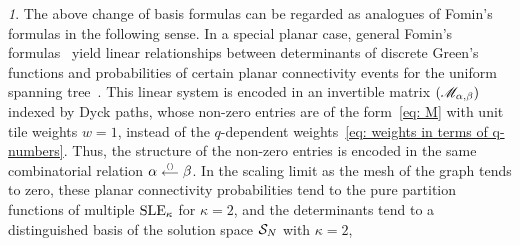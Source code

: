 \documentclass[oneside,english]{amsart}
\numberwithin{equation}{section}
\numberwithin{figure}{section}
\theoremstyle{plain}
\theoremstyle{plain}
\theoremstyle{plain}
\theoremstyle{remark}
\newtheorem{rem}[lem]{\protect\remarkname}
\theoremstyle{plain}
\theoremstyle{plain}
\theoremstyle{plain}
\theoremstyle{plain}
\theoremstyle{plain}
\theoremstyle{plain}
\theoremstyle{plain}
\theoremstyle{plain}
\providecommand{\remarkname}{Remark}
\begin{document}
%

\begin{rem}
The above change of basis formulas %
can be regarded as analogues of Fomin's formulas in the following sense.
In a special planar case, general Fomin's formulas~\cite{Fomin-LERW_and_total_positivity} yield
linear relationships between determinants of discrete Green's functions and 
probabilities of certain planar connectivity events for the uniform spanning tree~\cite[Section~3.4]{KKP-boundary_correlations_in_planar_LERW_and_UST}.
This linear system is encoded in an invertible matrix $(\mathscr{M}_{\alpha, \beta})$ indexed by Dyck paths, 
whose non-zero entries are of the form~\eqref{eq: M} with unit tile weights $w=1$, 
instead of the $q$-dependent weights~\eqref{eq: weights in terms of q-numbers}.
Thus, the structure of the non-zero entries is encoded in the same combinatorial relation $\alpha \stackrel{\scriptscriptstyle{()}}{\scriptstyle{\longleftarrow}} \beta$. 
In the scaling limit as the mesh of the graph tends to zero, these planar connectivity probabilities tend to
the pure partition functions of multiple $\mathrm{SLE}_\kappa$ for $\kappa = 2$,
and the determinants tend to a distinguished basis of the solution space $\mathcal{S}_N$ with $\kappa = 2$,

\end{rem}
\end{document}
